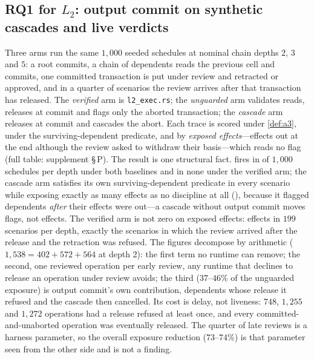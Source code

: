 \subsection{RQ1 for $L_2$: output commit on synthetic cascades and live verdicts}
\label{sec:l2-eval}
Three arms run the same $1{,}000$ seeded schedules at nominal chain depths
$2$, $3$ and $5$: a root commits, a chain of dependents reads the previous
cell and commits, one committed transaction is put under review and retracted
or approved, and in a quarter of scenarios the review arrives after that
transaction has released. The \emph{verified} arm is \texttt{l2\_exec.rs};
the \emph{unguarded} arm validates reads, releases at commit and flags only
the aborted transaction; the \emph{cascade} arm releases at commit and
cascades the abort. Each trace is scored under \cref{def:a3}, under the
surviving-dependent predicate, and by \emph{exposed effects}---effects out at
the end although the review asked to withdraw their basis---which reads no
flag (full table: supplement \S\,P). The result is one structural fact.
 fires in \LtwoDefThreeBaseline{} of $1{,}000$ schedules per
depth under both baselines and in none under the verified arm; the cascade
arm satisfies its own surviving-dependent predicate in every scenario while
exposing exactly as many effects as no discipline at all
(\LtwoExposedBaseline{}), because it flagged \LtwoRelabeled{} dependents
\emph{after} their effects were out---a cascade without output commit moves
flags, not effects. The verified arm is not zero on exposed effects:
\LtwoExposedVerified{} effects in $199$ scenarios per depth, exactly the
scenarios in which the review arrived after the release and the retraction
was refused. The figures decompose by arithmetic ($1{,}538 = 402 + 572 +
564$ at depth 2): the first term no runtime can remove; the second, one
reviewed operation per early review, any runtime that declines to release an
operation under review avoids; the third ($37$--$46\%$ of the unguarded
exposure) is output commit's own contribution, dependents whose release it
refused and the cascade then cancelled. Its cost is delay, not liveness:
$748$, $1{,}255$ and $1{,}272$ operations had a release refused at least
once, and every committed-and-unaborted operation was eventually released.
The quarter of late reviews is a harness parameter, so the overall exposure
reduction ($73$--$74\%$) is that parameter seen from the other side and is
not a finding.

